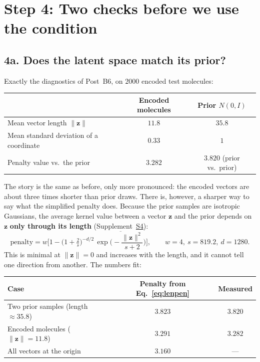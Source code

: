 \documentclass[11pt]{article}
\begin{document}
\section{Step 4: Two checks before we use the condition}
\subsection*{4a. Does the latent space match its prior?}
Exactly the diagnostics of Post~B6, on $2000$ encoded test molecules:

\begin{center}
\begin{tabular}{@{}lcc@{}}
\toprule
 & Encoded molecules & Prior $N(0,I)$\\
\midrule
Mean vector length $\lVert\bm z\rVert$ & $11.8$ & $35.8$\\
Mean standard deviation of a coordinate & $0.33$ & $1$\\
Penalty value vs.\ the prior & $3.282$ & $3.820$ (prior vs.\ prior)\\
\bottomrule
\end{tabular}
\end{center}

The story is the same as before, only more pronounced: the encoded vectors are about three times shorter than prior draws. There is, however, a sharper way to say what the simplified penalty does. Because the prior samples are isotropic Gaussians, the average kernel value between a vector $\bm z$ and the prior depends on $\bm z$ \textbf{only through its length} (Supplement~\hyperref[sec:S4]{S4}):
\begin{equation}
  \text{penalty}=w\Big[1-\Big(1+\tfrac2s\Big)^{-d/2}\,\overline{\exp\!\Big(-\frac{\lVert\bm z\rVert^2}{s+2}\Big)}\Big],\qquad w=4,\ s=819.2,\ d=1280 .
  \label{eq:lenpen}
\end{equation}
This is minimal at $\lVert\bm z\rVert=0$ and increases with the length, and it cannot tell one direction from another. The numbers fit:

\begin{center}
\small
\begin{tabular}{@{}lcc@{}}
\toprule
Case & Penalty from Eq.~\eqref{eq:lenpen} & Measured\\
\midrule
Two prior samples (length $\approx35.8$) & $3.823$ & $3.820$\\
Encoded molecules ($\lVert\bm z\rVert=11.8$) & $3.291$ & $3.282$\\
All vectors at the origin & $3.160$ & ---\\
\bottomrule
\end{tabular}
\end{center}
\end{document}
